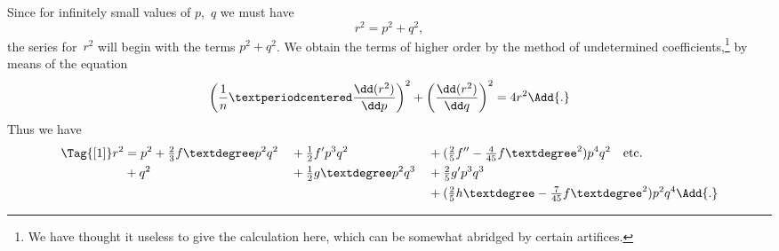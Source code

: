Since for infinitely small values of $p$,~$q$ we must have
\[
r^{2} = p^{2} + q^{2},
\]
the series for~$r^{2}$ will begin with the terms $p^{2} + q^{2}$. We obtain the terms of higher
order by the method of undetermined coefficients,\footnote
  {We have thought it useless to give the calculation here, which can be somewhat abridged by
  certain artifices.}
by means of the equation
\[
\left(\frac{1}{n}·\frac{\dd(r^{2})}{\dd p}\right)^{2}
  + \left(\frac{\dd(r^{2})}{\dd q}\right)^{2} = 4r^{2}\Add{.}
\]
Thus we have
\begin{alignat*}{3}
\Tag{[1]}
r^{2} &= p^{2} + \tfrac{2}{3}f°p^{2}q^{2} &&+ \tfrac{1}{2}f'p^{3}q^{2} &&+ (\tfrac{2}{5}f'' - \tfrac{4}{45}{f°}^{2})p^{4}q^{2}\quad\text{etc.} \\
      &+ q^{2} &&+ \tfrac{1}{2}g°p^{2}q^{3} &&+ \tfrac{2}{5}g'p^{3}q^{3} \\
      &&& &&+(\tfrac{2}{5}h° - \tfrac{7}{45}{f°}^{2})p^{2}q^{4}\Add{.}
\end{alignat*}

